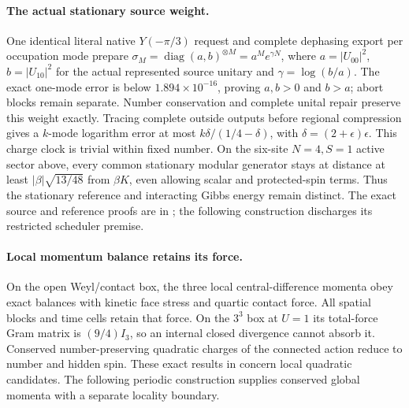 \paragraph{The actual stationary source weight.}
One identical literal native $Y(-\pi/3)$ request and complete dephasing
export per occupation mode prepare
$\sigma_M=\operatorname{diag}(a,b)^{\otimes M}=a^M e^{\gamma N}$,
where $a=|U_{00}|^2$, $b=|U_{10}|^2$ for the actual represented source
unitary and $\gamma=\log(b/a)$. The exact one-mode error is below
$1.894\times10^{-16}$, proving $a,b>0$ and $b>a$; abort blocks remain
separate. Number conservation and complete unital repair preserve this
weight exactly. Tracing complete outside outputs before regional
compression gives a $k$-mode logarithm error at most
$k\delta/(1/4-\delta)$, with $\delta=(2+\epsilon)\epsilon$.
This charge clock is trivial within fixed number. On the
six-site $N=4,S=1$ active sector above, every common stationary modular
generator stays at distance at least $|\beta|\sqrt{13/48}$ from
$\beta K$, even allowing scalar and protected-spin terms. Thus the
stationary reference and interacting Gibbs energy remain distinct.
The exact source and reference proofs are in
; the following construction
discharges its restricted scheduler premise.
{}
{}
{}
{}
\paragraph{Local momentum balance retains its force.}
On the open Weyl/contact box, the three local central-difference momenta
obey exact balances with kinetic face stress and quartic contact force.
All spatial blocks and time cells retain that force. On the $3^3$ box at
$U=1$ its total-force Gram matrix is $(9/4)I_3$, so an internal closed
divergence cannot absorb it. Conserved number-preserving quadratic charges
of the connected action reduce to number and hidden spin. These exact
results in  concern local
quadratic candidates. The following periodic construction supplies
conserved global momenta with a separate locality boundary.
